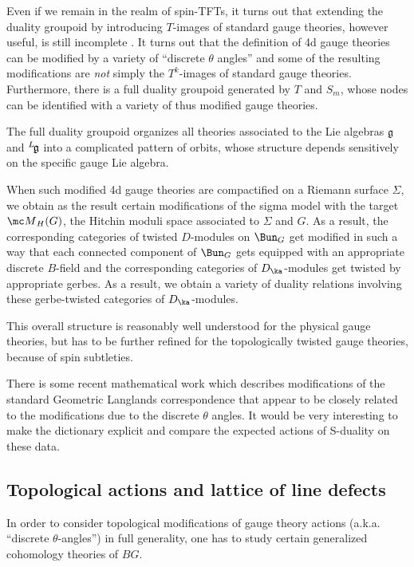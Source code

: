 \documentclass[11pt,reqno]{amsart}
\theoremstyle{plain}
\numberwithin{equation}{section}
\newcommand{\g}{\mathfrak{g}}
\def\neg{\negthinspace}
\def\lg{{}^L\neg\g}
\theoremstyle{definition}
\begin{document}
Even if we remain in the realm of spin-TFTs, it turns out that
extending the duality groupoid by introducing $T$-images of standard
gauge theories, however useful, is still incomplete \cite{GMN,AST}. It turns out that
the definition of 4d gauge theories can be modified by a variety of
``discrete $\theta$ angles'' and some of the resulting modifications
are {\it not} simply the $T^k$-images of standard gauge
theories. Furthermore, there is a full duality groupoid generated by
$T$ and $S_m$, whose nodes can be identified with a variety of thus
modified gauge theories.

The full duality groupoid organizes all theories associated to the Lie
algebras $\mathfrak{g}$ and $\lg$ into a complicated pattern of
orbits, whose structure depends sensitively on the specific gauge Lie
algebra.

When such modified 4d gauge theories are compactified on a Riemann
surface $\Sigma$, we obtain as the result certain modifications of the
sigma model with the target ${\mc M}_H(G)$, the Hitchin moduli space
associated to $\Sigma$ and $G$. As a result, the corresponding
categories of twisted $D$-modules on $\Bun_G$ get modified in such a
way that each connected component of $\Bun_G$ gets equipped with an
appropriate discrete $B$-field and the corresponding categories of
$D_\ka$-modules get twisted by appropriate gerbes. As a result, we
obtain a variety of duality relations involving these gerbe-twisted
categories of $D_\ka$-modules.

This overall structure is reasonably well understood for the physical
gauge theories, but has to be further refined for the topologically
twisted gauge theories, because of spin subtleties. 

There is some recent mathematical work \cite{GL,gaitsP} which
describes modifications of the standard Geometric Langlands
correspondence that appear to be closely related to the modifications
due to the discrete $\theta$ angles. It would be very
interesting to make the dictionary explicit and compare the expected
actions of S-duality on these data.

\subsection{Topological actions and lattice of line defects}

In order to consider topological modifications of gauge theory actions
(a.k.a. ``discrete $\theta$-angles'') in full generality, one has to
study certain generalized cohomology theories of $BG$.
\end{document}
